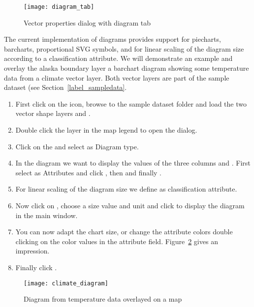 \begin{figure}[ht]
   \centering
   \texttt{[image: diagram\_tab]}
   \caption{Vector properties dialog with diagram tab \nixcaption}\label{fig:diagramtab}
\end{figure}

The current implementation of diagrams provides support for piecharts, barcharts, 
proportional SVG symbols, and for linear scaling of the diagram size according 
to a classification attribute. We will demonstrate an example and overlay the 
alaska boundary layer a barchart diagram showing some temperature data from 
a climate vector layer. Both vector layers are part of the \qg sample dataset (see
Section~\ref{label_sampledata}.

\begin{enumerate}
\item First click on the  icon,
browse to the \qg sample dataset folder and load the two vector shape layers
 and .
\item Double click the  layer in the map legend to open the
 dialog.
\item Click on the  and select  as
Diagram type.
\item In the diagram we want to display the values of the three columns
 and . First select
 as Attributes and click , then
 and finally .  
\item For linear scaling of the diagram size we define 
as classification attribute.
\item Now click on , choose a size value and unit
and click  to display the diagram in the \qg main window.
\item You can now adapt the chart size, or change the attribute colors double
clicking on the color values in the attribute field.
Figure~\ref{fig:climatediagram} gives an impression.
\item Finally click . 
\end{enumerate}

\begin{figure}[ht]
   \centering
   \texttt{[image: climate\_diagram]}
   \caption{Diagram from temperature data overlayed on a map \nixcaption}\label{fig:climatediagram}
\end{figure}

